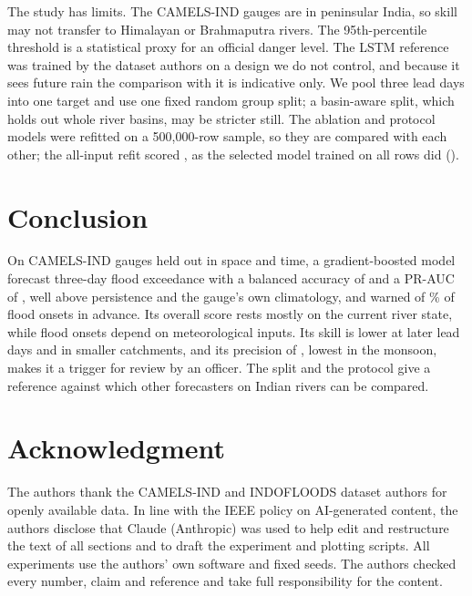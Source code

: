 \documentclass[conference]{IEEEtran}
\begin{document}
The study has limits. The CAMELS-IND gauges are in peninsular India, so skill may not transfer to Himalayan or Brahmaputra rivers. The 95th-percentile threshold is a statistical proxy for an official danger level. The LSTM reference was trained by the dataset authors on a design we do not control, and because it sees future rain the comparison with it is indicative only. We pool three lead days into one target and use one fixed random group split; a basin-aware split, which holds out whole river basins, may be stricter still. The ablation and protocol models were refitted on a 500,000-row sample, so they are compared with each other; the all-input refit scored \AblAllBA, as the selected model trained on all rows did (\XgbBA).

\section{Conclusion}
On CAMELS-IND gauges held out in space and time, a gradient-boosted model forecast three-day flood exceedance with a balanced accuracy of \XgbBA{} and a PR-AUC of \XgbPR, well above persistence and the gauge's own climatology, and warned of \EvXgbWarn\% of flood onsets in advance. Its overall score rests mostly on the current river state, while flood onsets depend on meteorological inputs. Its skill is lower at later lead days and in smaller catchments, and its precision of \XgbPrec{}, lowest in the monsoon, makes it a trigger for review by an officer. \LeakConclude{} The split and the protocol give a reference against which other forecasters on Indian rivers can be compared.

\section*{Acknowledgment}
The authors thank the CAMELS-IND and INDOFLOODS dataset authors for openly available data.
In line with the IEEE policy on AI-generated content, the authors disclose that Claude (Anthropic) was used to help edit and restructure the text of all sections and to draft the experiment and plotting scripts. All experiments use the authors' own software and fixed seeds. The authors checked every number, claim and reference and take full responsibility for the content.
\end{document}
